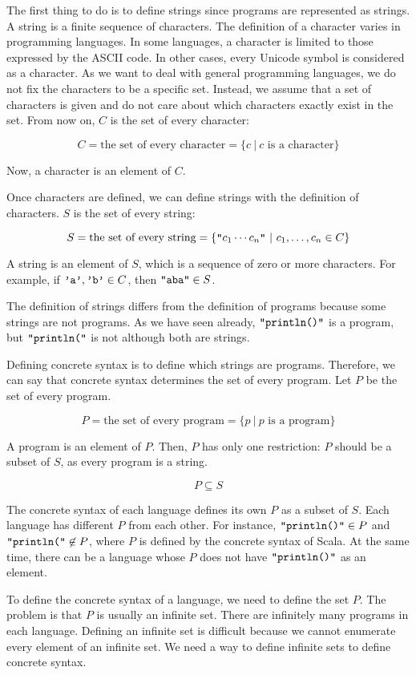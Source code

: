 The first thing to do is to define strings since programs are represented as
strings. A string is a finite sequence of characters. The definition of a
character varies in programming languages. In some languages, a character is
limited to those expressed by the ASCII code. In other cases, every Unicode symbol
is considered as a character. As we want to deal with general programming
languages, we do not fix the characters to be a specific set. Instead, we assume
that a set of characters is given and do not care about which characters exactly
exist in the set. From now on, $C$ is the set of every character:

\[C = \text{the set of every character} = \{ c\ |\ c\text{ is a character} \}\]

Now, a character is an element of $C$.

Once characters are defined, we can define strings with the definition of
characters. $S$ is the set of every string:

\[S = \text{the set of every string} = \{ \texttt{"}c_1\cdots c_n\texttt{"}\ |\
c_1,\ldots,c_n\in C \}\]

A string is an element of $S$, which is a
sequence of zero or more characters. For example, if $\texttt{'a'},\texttt{'b'}\in
C$, then $\texttt{"aba"}\in S$.

The definition of strings differs from the definition of programs because some
strings are not programs. As we have seen already, $\texttt{"println()"}$ is a program,
but $\texttt{"println("}$ is not although both are strings.

Defining concrete syntax is to define which strings are programs. Therefore,
we can say that concrete syntax determines the set of every program.
Let $P$ be the set of every program.

\[P = \text{the set of every program} = \{ p\ |\ p\text{ is a program} \}\]

A program is an element of $P$.
Then, $P$ has only one restriction: $P$ should be a subset of $S$, as
every program is a string.

\[P\subseteq S\]

The concrete syntax of each language defines its own $P$ as a subset of
$S$. Each language has different $P$ from each other. For instance,
$\texttt{"println()"} \in P$ and $\texttt{"println("}\not\in P$,
where $P$ is defined by the concrete syntax of Scala. At the same
time, there can be a language whose $P$ does not have $\texttt{"println()"}$ as an element.

To define the concrete syntax of a language, we need to define the set $P$. The
problem is that $P$ is usually an infinite set. There are infinitely many
programs in each language. Defining an infinite set is difficult because we
cannot enumerate every element of an infinite set. We need a way to define
infinite sets to define concrete syntax.

